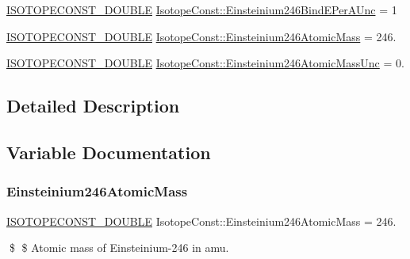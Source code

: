 \begin{DoxyCompactItemize}
\mbox{\hyperlink{group___isotope_const-_macros_ga8f45a7272ce02c0b4c65c44636ed719a}{I\+S\+O\+T\+O\+P\+E\+C\+O\+N\+S\+T\+\_\+\+D\+O\+U\+B\+LE}} \mbox{\hyperlink{group___isotope_const-_einsteinium-_es246_ga9f8ffa169421a1dba804abbd30f0f1d7}{Isotope\+Const\+::\+Einsteinium246\+Bind\+E\+Per\+A\+Unc}} = 1
\item 
\mbox{\hyperlink{group___isotope_const-_macros_ga8f45a7272ce02c0b4c65c44636ed719a}{I\+S\+O\+T\+O\+P\+E\+C\+O\+N\+S\+T\+\_\+\+D\+O\+U\+B\+LE}} \mbox{\hyperlink{group___isotope_const-_einsteinium-_es246_ga8426e0e80a419da20336703257f2bad8}{Isotope\+Const\+::\+Einsteinium246\+Atomic\+Mass}} = 246.
\item 
\mbox{\hyperlink{group___isotope_const-_macros_ga8f45a7272ce02c0b4c65c44636ed719a}{I\+S\+O\+T\+O\+P\+E\+C\+O\+N\+S\+T\+\_\+\+D\+O\+U\+B\+LE}} \mbox{\hyperlink{group___isotope_const-_einsteinium-_es246_ga1cc0c21392ebea940de516f0db144ac6}{Isotope\+Const\+::\+Einsteinium246\+Atomic\+Mass\+Unc}} = 0.
\end{DoxyCompactItemize}


\subsection{Detailed Description}


\subsection{Variable Documentation}
\mbox{\label{group___isotope_const-_einsteinium-_es246_ga8426e0e80a419da20336703257f2bad8}} 
\subsubsection{\texorpdfstring{Einsteinium246\+Atomic\+Mass}{Einsteinium246AtomicMass}}
{\footnotesize\ttfamily \mbox{\hyperlink{group___isotope_const-_macros_ga8f45a7272ce02c0b4c65c44636ed719a}{I\+S\+O\+T\+O\+P\+E\+C\+O\+N\+S\+T\+\_\+\+D\+O\+U\+B\+LE}} Isotope\+Const\+::\+Einsteinium246\+Atomic\+Mass = 246.}

\$ \$ Atomic mass of Einsteinium-\/246 in amu. \mbox{\label{group___isotope_const-_einsteinium-_es246_ga1cc0c21392ebea940de516f0db144ac6}} 
